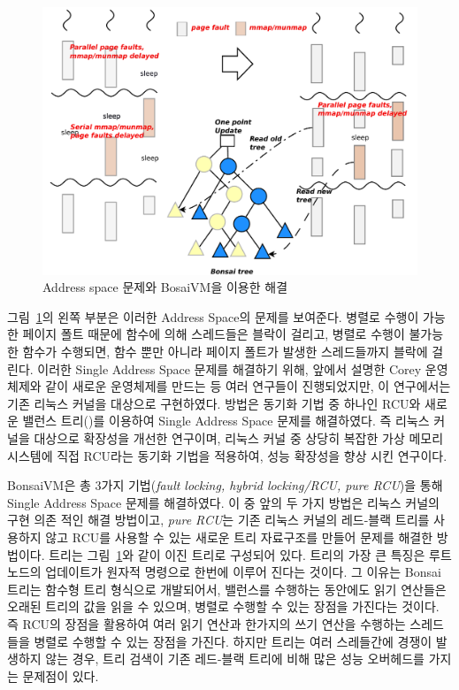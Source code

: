 \begin{figure}[h!]
    \centering
    \includegraphics[width=1\textwidth]{fig/bosaivm/bosaivm}
    \caption{Address space 문제와 BosaiVM을 이용한 해결}
  \label{fig:bonsaivm}
\end{figure}

그림~\ref{fig:bonsaivm}의 왼쪽 부분은 이러한 Address Space의 문제를 보여준다. 
병렬로 수행이 가능한 페이지 폴트 때문에  함수에 의해 스레드들은 블락이 걸리고, 병렬로 
수행이 불가능한  함수가 수행되면,  함수 뿐만 아니라 
페이지 폴트가 발생한 스레드들까지 블락에 걸린다.
이러한 Single Address Space 문제를 해결하기 위해, 앞에서 설명한 Corey 운영체제와 같이 새로운 운영체제를 
만드는 등 여러 연구들이 진행되었지만, 이 연구에서는 기존 리눅스 커널을 대상으로 구현하였다.
방법은 동기화 기법 중 하나인 RCU와 새로운 밸런스 트리()를 이용하여 Single Address Space 문제를
해결하였다.
즉 리눅스 커널을 대상으로 확장성을 개선한 연구이며, 
리눅스 커널 중 상당히 복잡한 가상 메모리 시스템에 직접 RCU라는 동기화 기법을 적용하여, 
성능 확장성을 향상 시킨 연구이다.
 
BonsaiVM은 총 3가지 기법(\textit{fault locking, hybrid locking/RCU, pure RCU})을 통해
Single Address Space 문제를 해결하였다.
이 중 앞의 두 가지 방법은 리눅스 커널의 구현 의존 적인 해결 방법이고, \textit{pure RCU}는 
기존 리눅스 커널의 레드-블랙 트리를 사용하지 않고 RCU를 사용할 수 있는 
새로운  트리 자료구조를 만들어 문제를 해결한 방법이다. 
 트리는 그림~\ref{fig:bonsaivm}와 같이 이진 트리로 구성되어 있다. 
 트리의 가장 큰 특징은 루트 노드의 업데이트가 원자적 명령으로 한번에 이루어 진다는 것이다. 
그 이유는 Bonsai 트리는 함수형 트리 형식으로 개발되어서, 밸런스를 수행하는 동안에도 읽기 연산들은 
오래된 트리의 값을 읽을 수 있으며, 병렬로 수행할 수 있는 장점을 가진다는 것이다.
즉 RCU의 장점을 활용하여 여러 읽기 연산과 한가지의 쓰기 연산을 수행하는 스레드들을 병렬로 수행할 수 
있는 장점을 가진다. 
하지만  트리는 여러 스레들간에 경쟁이 발생하지 않는 경우, 트리 검색이 기존 레드-블랙 트리에 비해 많은 성능 
오버헤드를 가지는 문제점이 있다. 
 
